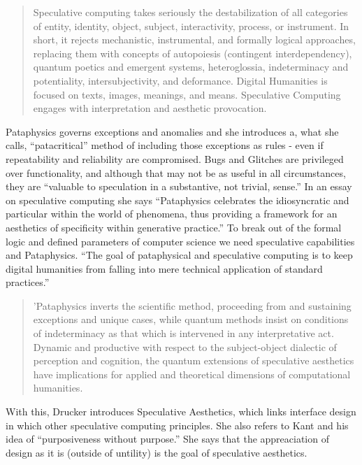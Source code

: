 \begin{quote}
  Speculative computing takes seriously the destabilization of all categories of entity, identity, object, subject, interactivity, process, or instrument. In short, it rejects mechanistic, instrumental, and formally logical approaches, replacing them with concepts of autopoiesis (contingent interdependency), quantum poetics and emergent systems, heteroglossia, indeterminacy and potentiality, intersubjectivity, and deformance. Digital Humanities is focused on texts, images, meanings, and means. Speculative Computing engages with interpretation and aesthetic provocation. \citep[p.29]{Drucker2009}
\end{quote}

Pataphysics governs exceptions and anomalies and she introduces a, what she calls, ``patacritical'' method of including those exceptions as rules - even if repeatability and reliability are compromised. Bugs and Glitches are privileged over functionality, and although that may not be as useful in all circumstances, they are ``valuable to speculation in a substantive, not trivial, sense.'' In an essay on speculative computing \citep{Drucker2007} she says ``Pataphysics celebrates the idiosyncratic and particular within the world of phenomena, thus providing a framework for an aesthetics of specificity within generative practice.'' To break out of the formal logic and defined parameters of computer science we need speculative capabilities and Pataphysics. ``The goal of pataphysical and speculative computing is to keep digital humanities from falling into mere technical application of standard practices.''

\begin{quote}
  'Pataphysics inverts the scientific method, proceeding from and sustaining exceptions and unique cases, while quantum methods insist on conditions of indeterminacy as that which is intervened in any interpretative act. Dynamic and productive with respect to the subject-object dialectic of perception and cognition, the quantum extensions of speculative aesthetics have implications for applied and theoretical dimensions of computational humanities. \citep{Drucker2007}
\end{quote}

With this, Drucker introduces Speculative Aesthetics, which links interface design in which other speculative computing principles. She also refers to Kant and his idea of ``purposiveness without purpose.'' She says that the appreaciation of design as it is (outside of untility) is the goal of speculative aesthetics.
